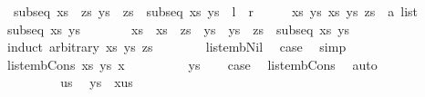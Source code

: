 \begin{isabellebody}
\ \ {\isachardoublequoteopen}subseq\ {\isacharparenleft}xs\ {\isacharat}\ zs{\isacharparenright}\ {\isacharparenleft}ys\ {\isacharat}\ zs{\isacharparenright}\ {\isasymlongleftrightarrow}\ subseq\ xs\ ys{\isachardoublequoteclose}\ {\isacharparenleft}\ {\isachardoublequoteopen}{\isacharquery}l\ {\isacharequal}\ {\isacharquery}r{\isachardoublequoteclose}{\isacharparenright}\isanewline
%
\isadelimproof
%
\endisadelimproof
%
\isatagproof
{}\isamarkupfalse%
\isanewline
\ \ \isacommand{{\isacharbraceleft}}\isamarkupfalse%
\ \isamarkupfalse%
\ xs{\isacharprime}\ ys{\isacharprime}\ xs\ ys\ zs\ {\isacharcolon}{\isacharcolon}\ {\isachardoublequoteopen}{\isacharprime}a\ list{\isachardoublequoteclose}\ \isamarkupfalse%
\ {\isachardoublequoteopen}subseq\ xs{\isacharprime}\ ys{\isacharprime}{\isachardoublequoteclose}\isanewline
\ \ \ \ \isamarkupfalse%
\ \isamarkupfalse%
\ {\isachardoublequoteopen}xs{\isacharprime}\ {\isacharequal}\ xs\ {\isacharat}\ zs\ {\isasymand}\ ys{\isacharprime}\ {\isacharequal}\ ys\ {\isacharat}\ zs\ {\isasymlongrightarrow}\ subseq\ xs\ ys{\isachardoublequoteclose}\isanewline
\ \ \ \ \isamarkupfalse%
\ {\isacharparenleft}induct\ arbitrary{\isacharcolon}\ xs\ ys\ zs{\isacharparenright}\isanewline
\ \ \ \ \ \ \isamarkupfalse%
\ list{\isacharunderscore}emb{\isacharunderscore}Nil\ \isamarkupfalse%
\ {\isacharquery}case\ \isamarkupfalse%
\ simp\isanewline
\ \ \ \ \isamarkupfalse%
\isanewline
\ \ \ \ \ \ \isamarkupfalse%
\ {\isacharparenleft}list{\isacharunderscore}emb{\isacharunderscore}Cons\ xs{\isacharprime}\ ys{\isacharprime}\ x{\isacharparenright}\isanewline
\ \ \ \ \ \ \isacommand{{\isacharbraceleft}}\isamarkupfalse%
\ \isamarkupfalse%
\ {\isachardoublequoteopen}ys{\isacharequal}{\isacharbrackleft}{\isacharbrackright}{\isachardoublequoteclose}\ \isamarkupfalse%
\ \isamarkupfalse%
\ {\isacharquery}case\ \isamarkupfalse%
\ list{\isacharunderscore}emb{\isacharunderscore}Cons{\isacharparenleft}{}{\isacharparenright}\ \isamarkupfalse%
\ auto\ \isacommand{{\isacharbraceright}}\isamarkupfalse%
\isanewline
\ \ \ \ \ \ \isamarkupfalse%
\isanewline
\ \ \ \ \ \ \isacommand{{\isacharbraceleft}}\isamarkupfalse%
\ \isamarkupfalse%
\ us\ \isamarkupfalse%
\ {\isachardoublequoteopen}ys\ {\isacharequal}\ x{\isacharhash}us{\isachardoublequoteclose}\isanewline

\end{isabellebody}
